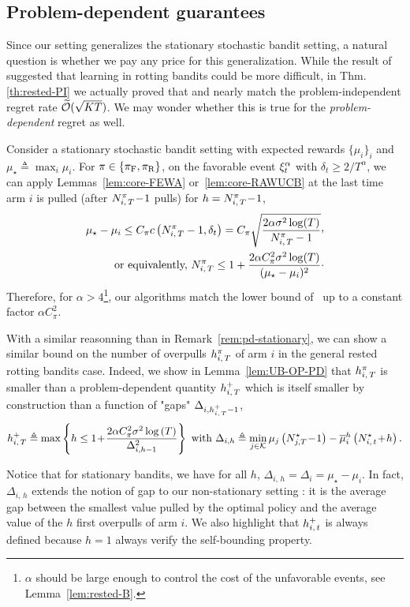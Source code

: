 \subsection{Problem-dependent guarantees}
\label{ss:rested-PD}
Since our setting generalizes the stationary stochastic bandit setting, a natural question is whether we pay any price for this generalization. While the result of~\citet{levine2017rotting} suggested that learning in rotting bandits could be more difficult, in Thm.\,\ref{th:rested-PI} we actually proved that \FEWA and \RUCB nearly match the problem-independent regret rate $\widetilde{\mathcal{O}}(\sqrt{KT})$. We may wonder whether this is true for the \emph{problem-dependent} regret as well.
%
\begin{remark}\label{rem:pd-stationary}
Consider a stationary stochastic bandit setting with expected rewards $\{\mu_i\}_i $ and $\mu_\star \triangleq \max_i \mu_i$. For $\pi \in \left\{\pi_{\rm F}, \pi_{\rm R}\right\}$, on the favorable event $\xi^\alpha_t$ with $\delta_t \geq 2/T^\alpha$,  we can apply Lemmas~\ref{lem:core-FEWA} or~\ref{lem:core-RAWUCB} at the last time arm $i$ is pulled (\ie after $N_{i,\,T}^\pi\!-\!1$ pulls) for $h = N_{i,\,T}^\pi\!-\!1$, 
\begin{align}
\mu_\star - \mu_i \leq C_\pi c\pa{\NiTpi-1,  \delta_t} = C_\pi\sqrt{\frac{2\alpha\sigma^2 \log(T)}{\NiTpi -1}} \CommaBin\nonumber \\
\text{\ or equivalently,\ }
\NiTpi \leq 1+ \frac{2\alpha C_\pi^2 \sigma^2 \log(T)}{(\mu_{\star} - \mu_i) ^2}\cdot\label{eq:LaiRob}
\end{align}
Therefore, for $\alpha > 4$\footnote{$\alpha$ should be large enough to control the cost of the unfavorable events, see Lemma~\ref{lem:rested-B}.}, our algorithms match the lower bound of~\citet{lai1985asymptotically} up to a constant factor $\alpha C_\pi^2$.
\end{remark}
%
With a similar reasonning than in Remark~\ref{rem:pd-stationary}, we can show a similar bound on the number of overpulls $h_{i,\,T}^\pi$  of arm $i$ in the general rested rotting bandits case. Indeed, we show in Lemma~\ref{lem:UB-OP-PD} that $h_{i,\,T}^\pi$ is smaller than a problem-dependent quantity $h_{i,\,T}^+$ which is itself smaller by construction than a function of "gaps" $\Delta_{i,h_{i,\,T}^+-1}$,
%
\begin{equation}
\label{eq:hit+}
h_{i,\,T}^+ \triangleq \max \left\{ h \leq 
1 \! + \! \frac{2\alpha C_\pi^2 \sigma^2 \log \left(T\right)}{\Delta_{i,h-1}^2} \right\}\text{ with  } \Delta_{i,h} \triangleq \min_{j \in \mathcal{K}} \mu_j\left(N_{j,T}^\star \!-\!1\right) - \overline{\mu}_i^h\left( N_{i,\,t}^\star\!+\!h \right). 
\end{equation}
\begin{remark}
Notice that for stationary bandits, we have for all $h$, $\Delta_{i,\,h} = \Delta_i = \mu_\star - \mu_i$. In fact, $ \Delta_{i,\,h} $ extends the notion of gap to our non-stationary setting : it is the average gap between the smallest value pulled by the optimal policy and the average value of the $h$ first overpulls of arm $i$.  We also highlight that $h_{i,\,t}^+$ is always defined because $h=1$ always verify the self-bounding property. 
\end{remark}

